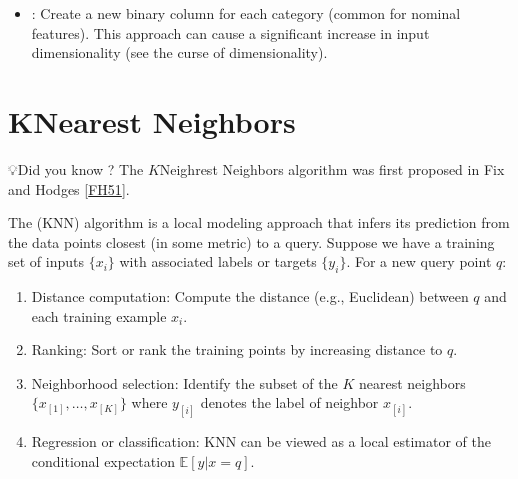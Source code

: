 \documentclass[letterpaper,10pt,english]{jupyterBook}
\begin{document}
\begin{itemize}
\begin{itemize}
\item {} 
\sphinxAtStartPar
{}: Create a new binary column for each category (common for nominal features). This approach can cause a significant increase in input dimensionality (see the curse of dimensionality).

\end{itemize}

\end{itemize}


\section{K\sphinxhyphen{}Nearest Neighbors}
\label{\detokenize{03:k-nearest-neighbors}}
\begin{sphinxShadowBox}
\sphinxstylesidebartitle{}

\sphinxAtStartPar
💡Did you know ? The \(K\)\sphinxhyphen{}Neighrest Neighbors algorithm was first proposed in Fix and Hodges {[}\hyperlink{cite.bibliography:id2}{FH51}{]}.
\end{sphinxShadowBox}

\sphinxAtStartPar
The  (KNN) algorithm is a local modeling approach that infers its prediction from the data points closest (in some metric) to a query. Suppose we have a training set of inputs \(\{x_i\}\) with associated labels or targets \(\{y_i\}\). For a new query point \(q\):
\begin{enumerate}
%
\item {} 
\sphinxAtStartPar
Distance computation: Compute the distance (e.g., Euclidean) between \(q\) and each training example \(x_i\).

\item {} 
\sphinxAtStartPar
Ranking: Sort or rank the training points by increasing distance to \(q\).

\item {} 
\sphinxAtStartPar
Neighborhood selection: Identify the subset of the \(K\) nearest neighbors \(\{x_{[1]}, \dots, x_{[K]}\}\) where \(y_{[i]}\) denotes the label of neighbor \(x_{[i]}\).

\item {} 
\sphinxAtStartPar
Regression or classification: KNN can be viewed as a local estimator of the conditional expectation \(\mathbb{E}[y|x=q]\).

\end{enumerate}
\end{document}
